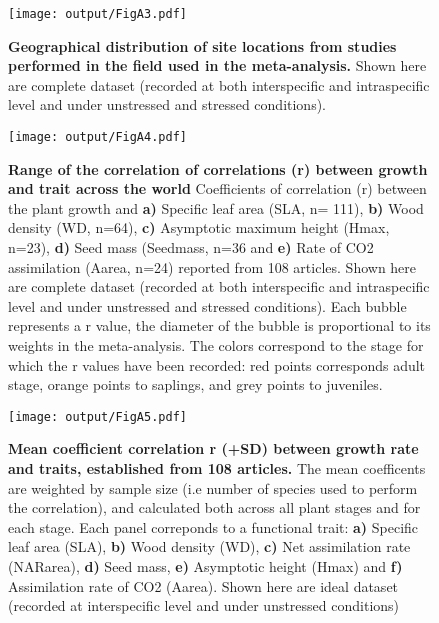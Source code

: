 \documentclass[a4paper]{article}\usepackage[]{graphicx}\usepackage[]{color}
\begin{document}
\begin{appendices}
\begin{figure}[htbp]
\centering
\texttt{[image: output/FigA3.pdf]}
\caption{\textbf{Geographical distribution of site locations from studies performed in the field used in the meta-analysis.} Shown here are complete dataset (recorded at both interspecific and intraspecific level and under unstressed and stressed conditions).}
\label{FigA3}
\end{figure}


\begin{figure}[htbp]
\centering
\texttt{[image: output/FigA4.pdf]}
\caption{\textbf{Range of the correlation of correlations (r) between
growth and trait across the world} Coefficients of correlation (r)
between the plant growth and \textbf{a)} Specific leaf area (SLA, n=
111), \textbf{b)} Wood density (WD, n=64), \textbf{c)} Asymptotic
maximum height (Hmax, n=23), \textbf{d)} Seed mass (Seedmass, n=36 and
\textbf{e)} Rate of CO2 assimilation (Aarea, n=24) reported from 108
articles. Shown here are complete dataset (recorded at both interspecific and intraspecific level and under unstressed and stressed conditions). Each bubble represents a r value, the diameter of the bubble
is proportional to its weights in the meta-analysis. The colors
correspond to the stage for which the r values have been recorded: red
points corresponds adult stage, orange points to saplings, and grey
points to juveniles.}
\label{FigA4}
\end{figure}


\begin{figure}[htbp]
\centering
\texttt{[image: output/FigA5.pdf]}
\caption{\textbf{Mean coefficient correlation r (+SD) between growth
rate and traits, established from 108 articles.} The mean
coefficents are weighted by sample size (i.e number of species used to
perform the correlation), and calculated both across all plant stages
and for each stage. Each panel correponds to a functional trait:
\textbf{a)} Specific leaf area (SLA), \textbf{b)} Wood density (WD),
\textbf{c)} Net assimilation rate (NARarea), \textbf{d)} Seed mass,
\textbf{e)} Asymptotic height (Hmax) and \textbf{f)} Assimilation rate
of CO2 (Aarea). Shown here are ideal dataset (recorded at interspecific level and under unstressed  conditions)}
\label{FigA5}
\end{figure}


\end{appendices}
\end{document}
